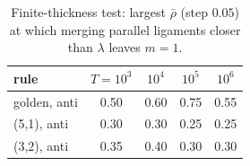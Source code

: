 \begin{table}[h]\caption{Finite-thickness test: largest $\bar\rho$ (step $0.05$) at which merging parallel ligaments closer than $\lambda$ leaves $m=1$.}\label{tab:snap}
\begin{ruledtabular}\begin{tabular}{lcccc}rule & $T=10^{3}$ & $10^{4}$ & $10^{5}$ & $10^{6}$ \\ \hline
golden, anti & 0.50 & 0.60 & 0.75 & 0.55 \\
(5,1), anti & 0.30 & 0.30 & 0.25 & 0.25 \\
(3,2), anti & 0.35 & 0.40 & 0.30 & 0.30 \\
\end{tabular}\end{ruledtabular}\end{table}
